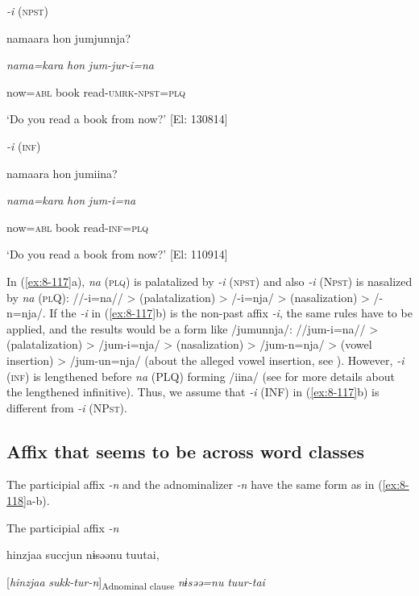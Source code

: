 \ea\label{ex:8-117}
\ea \textit{{}-i} (\textsc{npst})

    {\TM}
\glll  namaara  hon  jumjunnja?

      \textit{nama=kara}  \textit{hon}  \textit{jum-jur-i=na}

      now=\textsc{abl}  book  read-\textsc{umrk}-\textsc{npst}=\textsc{plq}

\glt ‘Do you read a book from now?’ [El: 130814]

\ex \textit{{}-i} (\textsc{inf})

    {\TM}
\glll  namaara  hon  jumiina?

      \textit{nama=kara}  \textit{hon}  \textit{jum-i=na}

      now=\textsc{abl}  book  read-\textsc{inf}=\textsc{plq}

\glt ‘Do you read a book from now?’ [El: 110914]

In (\ref{ex:8-117}a), \textit{na} (\textsc{plq}) is palatalized by \textit{{}-i} (\textsc{npst}) and also \textit{{}-i} (N\textsc{pst}) is nasalized by \textit{na} (\textsc{pl}Q): //-i=na// > (palatalization) > /-i=nja/ > (nasalization) > /-n=nja/. If the \textit{{}-i} in (\ref{ex:8-117}b) is the non-past affix \textit{{}-i}, the same rules have to be applied, and the results would be a form like /jumunnja/: //jum-i=na// > (palatalization) > /jum-i=nja/ > (nasalization) > /jum-n=nja/ > (vowel insertion) > /jum-un=nja/ (about the alleged vowel insertion, see ). However, \textit{{}-i} (\textsc{inf}) is lengthened before \textit{na} (PLQ) forming /iina/ (see  for more details about the lengthened infinitive). Thus, we assume that \textit{{}-i} (INF) in (\ref{ex:8-117}b) is different from \textit{{}-i} (NP\textsc{st}).

\subsection{Affix that seems to be across word classes}

The participial affix \textit{{}-n} and the adnominalizer \textit{{}-n} have the same form as in (\ref{ex:8-118}a-b).

\ea\label{ex:8-118}
\ea The participial affix \textit{{}-n}

  {\TM}
\glll   hinzjaa  succjun  nɨsəənu  tuutai,

    [\textit{hinzjaa}  \textit{sukk-tur-n}]\textsubscript{Adnominal clause}  \textit{nɨsəə=nu}  \textit{tuur-tai}

